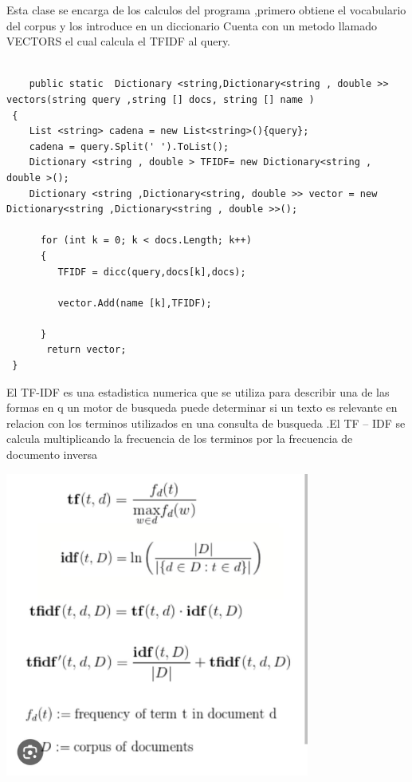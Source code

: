 \documentclass{article}
\begin{document}
\vspace {0.3cm}
Esta clase se encarga de los calculos del programa ,primero obtiene el vocabulario del corpus  y los introduce en un diccionario 
Cuenta con un metodo llamado VECTORS el cual calcula el TFIDF al query.
\tiny
\begin{lstlisting}

    public static  Dictionary <string,Dictionary<string , double >> vectors(string query ,string [] docs, string [] name )
 {
    List <string> cadena = new List<string>(){query};
    cadena = query.Split(' ').ToList();
    Dictionary <string , double > TFIDF= new Dictionary<string , double >();
    Dictionary <string ,Dictionary<string, double >> vector = new Dictionary<string ,Dictionary<string , double >>();

      for (int k = 0; k < docs.Length; k++)
      {
         TFIDF = dicc(query,docs[k],docs);

         vector.Add(name [k],TFIDF);
        
      }
       return vector;
 }
\end{lstlisting}

\vspace{1.0 cm}
\large
El TF-IDF es una estadistica numerica que se utiliza para describir una de las formas en  q un  motor de busqueda puede determinar si un texto es relevante en relacion con los terminos utilizados en una consulta de busqueda .El TF – IDF se calcula multiplicando la frecuencia de los terminos por la frecuencia de documento inversa 
\vspace{1.0cm}

\includegraphics[width=10cm]{tf-idf.jpg.jpeg}
\end{document}
